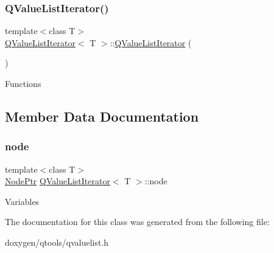 \subsubsection{\texorpdfstring{QValueListIterator()}{QValueListIterator()}}
{\footnotesize\ttfamily template$<$class T$>$ \\
\mbox{\hyperlink{class_q_value_list_iterator}{Q\+Value\+List\+Iterator}}$<$ T $>$\+::\mbox{\hyperlink{class_q_value_list_iterator}{Q\+Value\+List\+Iterator}} (\begin{DoxyParamCaption}{ }\end{DoxyParamCaption})\hspace{0.3cm}{\ttfamily [inline]}}

Functions 

\subsection{Member Data Documentation}
\mbox{\label{class_q_value_list_iterator_aec667067d973ccc7258b5d898f89fffe}} 
\subsubsection{\texorpdfstring{node}{node}}
{\footnotesize\ttfamily template$<$class T$>$ \\
\mbox{\hyperlink{class_q_value_list_iterator_abf409d04d86ddd5977132fecb2e6db61}{Node\+Ptr}} \mbox{\hyperlink{class_q_value_list_iterator}{Q\+Value\+List\+Iterator}}$<$ T $>$\+::node}

Variables 

The documentation for this class was generated from the following file\+:\begin{DoxyCompactItemize}
\item 
doxygen/qtools/qvaluelist.\+h\end{DoxyCompactItemize}
